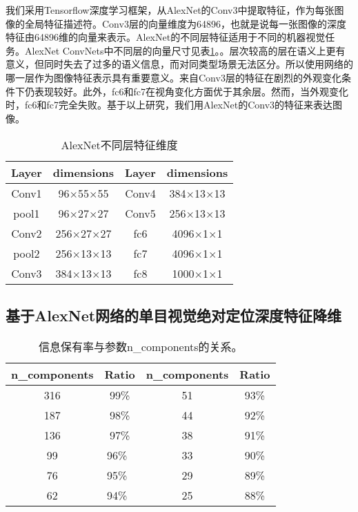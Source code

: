 我们采用Tensorflow深度学习框架，从AlexNet的Conv3中提取特征，作为每张图像的全局特征描述符。Conv3层的向量维度为64896，也就是说每一张图像的深度特征由64896维的向量来表示。AlexNet的不同层特征适用于不同的机器视觉任务。AlexNet ConvNets中不同层的向量尺寸见表\ref{tab:layer}。\cite{krizhevsky2012imagenet}。层次较高的层在语义上更有意义\cite{sunderhauf2015performance}，但同时失去了过多的语义信息，而对同类型场景无法区分。所以使用网络的哪一层作为图像特征表示具有重要意义。来自Conv3层的特征在剧烈的外观变化条件下仍表现较好。此外，fc6和fc7在视角变化方面优于其余层。然而，当外观变化时，fc6和fc7完全失败。基于以上研究，我们用AlexNet的Conv3的特征来表达图像。

\begin{table}[!htbp] 
    \caption{AlexNet不同层特征维度} 
    \label{tab:layer}
    \begin{center} 
        \begin{tabular}{c c c c} 
              \toprule
             Layer & dimensions & Layer & dimensions\\
              \midrule 
             Conv1 & 96$\times$55$\times$55 & Conv4 & 384$\times$13$\times$13\\
             pool1 & 96$\times$27$\times$27 & Conv5 & 256$\times$13$\times$13\\
             Conv2 & 256$\times$27$\times$27 & fc6 & 4096$\times$1$\times$1\\
             pool2 & 256$\times$13$\times$13 & fc7 & 4096$\times$1$\times$1\\
             Conv3 & 384$\times$13$\times$13 & fc8 & 1000$\times$1$\times$1\\
             \bottomrule 
         \end{tabular} 
     \end{center} 
 \end{table}
\subsection{基于AlexNet网络的单目视觉绝对定位深度特征降维}
\begin{table}[!htbp] 
    \caption{信息保有率与参数n\_components的关系。} 
    \label{tab:component}
    \begin{center} 
        \begin{tabular}{cccc} 
              \toprule
             n\_components&Ratio& n\_components&Ratio\\
              \midrule 
              316 & 99\%  & 51  & 93\%\\
              187 & 98\%  & 44  & 92\%\\
              136 & 97\%  & 38  & 91\%\\ 
              99  & 96\%\ & 33  & 90\%\\ 
              76  & 95\%\ & 29  & 89\%\\          
              62  & 94\%\ & 25  & 88\%\\ 
                         \bottomrule 
         \end{tabular} 
     \end{center} 
 \end{table}{}


